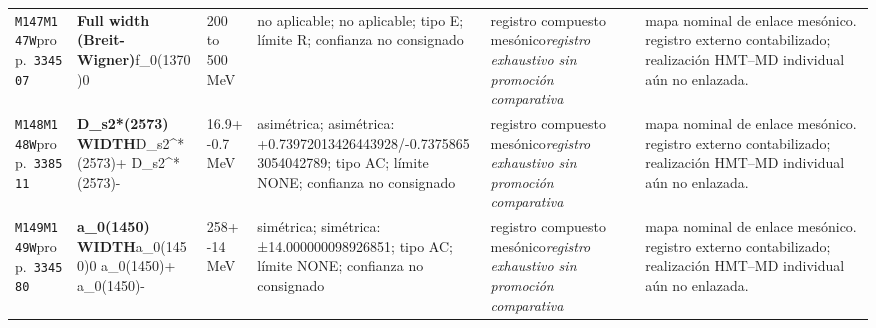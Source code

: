 \begin{landscape}
\begin{longtable}{L{1.85cm}L{4.45cm}L{2.35cm}L{4.05cm}L{3.35cm}L{7.15cm}}
\texttt{M147}\newline \texttt{M147W}\newline prop.\ \texttt{334507} & \textbf{Full width (Breit-Wigner)}\newline f\_\allowbreak{}0(1370)0 & 200 to 500\,MeV & no aplicable; no aplicable; tipo E; límite R; confianza no consignado & registro compuesto mesónico\newline \emph{registro exhaustivo sin promoción comparativa} & mapa nominal de enlace mesónico. registro externo contabilizado; realización HMT--MD individual aún no enlazada. \\
\texttt{M148}\newline \texttt{M148W}\newline prop.\ \texttt{338511} & \textbf{D\_\allowbreak{}s2*(2573) WIDTH}\newline D\_\allowbreak{}s2\textasciicircum{}*(2573)+ \textbar{}\allowbreak{} D\_\allowbreak{}s2\textasciicircum{}*(2573)- & 16.9+-0.7\,MeV & asimétrica; asimétrica: +0.73972013426443928/-0.73758653054042789; tipo AC; límite NONE; confianza no consignado & registro compuesto mesónico\newline \emph{registro exhaustivo sin promoción comparativa} & mapa nominal de enlace mesónico. registro externo contabilizado; realización HMT--MD individual aún no enlazada. \\
\texttt{M149}\newline \texttt{M149W}\newline prop.\ \texttt{334580} & \textbf{a\_\allowbreak{}0(1450) WIDTH}\newline a\_\allowbreak{}0(1450)0 \textbar{}\allowbreak{} a\_\allowbreak{}0(1450)+ \textbar{}\allowbreak{} a\_\allowbreak{}0(1450)- & 258+-14\,MeV & simétrica; simétrica: ±14.000000098926851; tipo AC; límite NONE; confianza no consignado & registro compuesto mesónico\newline \emph{registro exhaustivo sin promoción comparativa} & mapa nominal de enlace mesónico. registro externo contabilizado; realización HMT--MD individual aún no enlazada. \\

\end{longtable}
\end{landscape}
